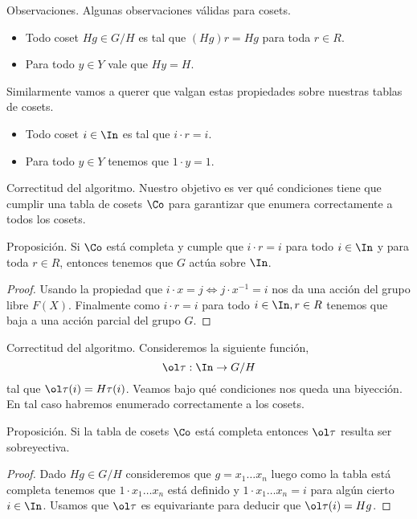 \documentclass[aspectratio=169, 9pt]{beamer}
\begin{document}
\begin{frame}[fragile]{Observaciones.}
	Algunas observaciones válidas para cosets.
	\pause
	\begin{itemize}		
		\item Todo coset $Hg \in G/H$ es tal que $(Hg)r = Hg$ para toda $r \in R$.
		
		\item Para todo $y \in Y$ vale que $Hy = H$.
	\end{itemize}	
	\pause
	Similarmente vamos a querer que valgan estas propiedades sobre nuestras tablas de cosets.
	\begin{itemize}
		\item Todo coset $i \in \In$ es tal que $i \cdot r = i$.
		
		\item Para todo $y \in Y$ tenemos que $1 \cdot y = 1$.
	\end{itemize}
\end{frame}


\begin{frame}[fragile]{Correctitud del algoritmo.}
	Nuestro objetivo es ver qué condiciones tiene que cumplir una tabla de cosets $\Co$ para garantizar que enumera correctamente a todos los cosets.
	\pause
	\begin{alertblock}{Proposición.}
		Si $\Co$ está completa y cumple que  $i \cdot r = i$ para todo $i \in \In$ y para toda $r \in R$, entonces tenemos que $G$ actúa sobre $\In$.
	\end{alertblock}
	\medskip
	\pause
	\begin{proof}
		Usando la propiedad que $i \cdot x = j \iff j\cdot x^{-1} = i$ nos da una acción del grupo libre $F(X)$.
		\pause
		Finalmente como $i \cdot r = i$ para todo $i \in \In, r \in R$ tenemos que baja a una acción parcial del grupo $G$. 
	\end{proof}
\end{frame}


\begin{frame}[fragile]{Correctitud del algoritmo.}
	Consideremos la siguiente función,
	\[
	\ol \tau: \In \to G/H
	\]
	tal que $\ol \tau (i) = H \tau (i)$.
	\pause
	Veamos bajo qué condiciones nos queda una biyección. 
	En tal caso habremos enumerado correctamente a los cosets.
	\medskip
	
	
	
	\begin{alertblock}{Proposición.}
		Si la tabla de cosets $\Co$ está completa entonces $\ol \tau$ resulta ser sobreyectiva.
	\end{alertblock}
	\pause
	
	\begin{proof}
		Dado $Hg \in G/H$ consideremos que $g = x_1 \dots x_n$ \pause luego como la tabla está completa tenemos que $1 \cdot x_1 \dots x_n$ está definido y $1 \cdot x_1 \dots x_n  = i$ para algún cierto $i \in \In$.
		\pause
		Usamos que $\ol \tau$ es equivariante para deducir que $\ol \tau (i) = Hg$.
	\end{proof}
	
	
	
	
\end{frame}
\end{document}
